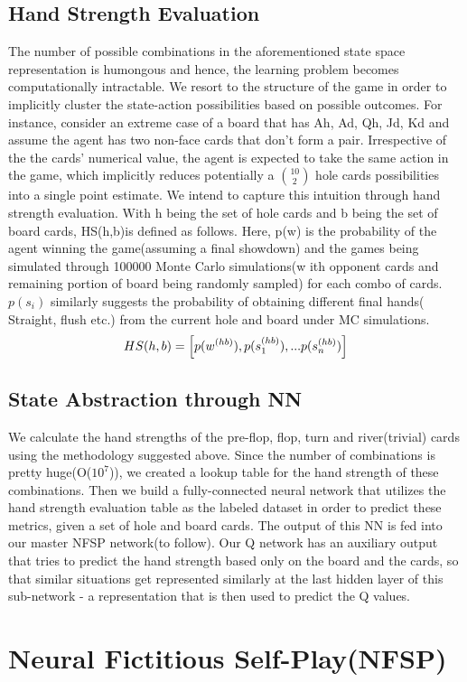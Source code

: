 \documentclass{article}
\begin{document}
\subsection{Hand Strength Evaluation}
The number of possible combinations in the aforementioned state space representation is humongous and hence, the learning problem becomes computationally intractable. We resort to the structure of the game in order to implicitly cluster the state-action possibilities based on possible outcomes. For instance, consider an extreme case of a board that has {Ah, Ad, Qh, Jd, Kd} and assume the agent has two non-face cards that don't form a pair. Irrespective of the the cards' numerical value, the agent is expected to take the same action in the game, which implicitly reduces potentially a ${10}\choose{2}$ hole cards possibilities into a single point estimate. We intend to capture this intuition through  hand strength evaluation. With h being the set of hole cards and b being the set of board cards, HS(h,b)is defined as follows. Here, p(w) is the probability of the agent winning the game(assuming a final showdown) and the games being simulated through 100000 Monte Carlo simulations(w ith opponent cards and remaining portion of board being randomly sampled) for each combo of cards. $p(s_i)$ similarly suggests the probability of obtaining different final hands( Straight, flush etc.) from the current hole and board under MC simulations.
\[HS(h,b) = \Bigl[ p(w^{(hb)}), p(s_1^{(hb)}), ... p(s_n^{(hb)}) \Bigr ]\]
\subsection{State Abstraction through NN}
We calculate the hand strengths of the pre-flop, flop, turn and river(trivial) cards using the methodology suggested above. Since the number of combinations is pretty huge(O($10^7$)), we created a lookup table for the hand strength of these combinations. Then we build a fully-connected neural network that utilizes the hand strength evaluation table as the labeled dataset in order to predict these metrics, given a set of hole and board cards. The output of this NN is fed into our master NFSP network(to follow). Our Q network has an auxiliary output that tries to predict the hand strength based only on the board and the cards, so that similar situations get represented similarly at the last hidden layer of this sub-network - a representation that is then used to predict the Q values.
\section{Neural Fictitious Self-Play(NFSP)}
\end{document}
